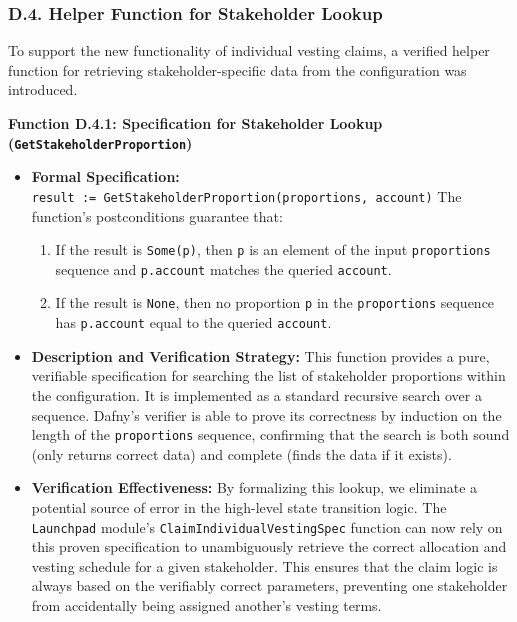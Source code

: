 \documentclass[
  english,
  onecolumn]{article}
\providecommand{\tightlist}{%
  \setlength{\itemsep}{0pt}\setlength{\parskip}{0pt}}
\begin{document}
\subsubsection{D.4. Helper Function for Stakeholder
Lookup}\label{d.4.-helper-function-for-stakeholder-lookup}

To support the new functionality of individual vesting claims, a
verified helper function for retrieving stakeholder-specific data from
the configuration was introduced.

\textbf{Function D.4.1: Specification for Stakeholder Lookup
(\texttt{GetStakeholderProportion})}

\begin{itemize}
\tightlist
\item
  \textbf{Formal Specification:}
  \texttt{result\ :=\ GetStakeholderProportion(proportions,\ account)}
  The function's postconditions guarantee that:

  \begin{enumerate}
  \def\labelenumi{\arabic{enumi}.}
  \tightlist
  \item
    If the result is \texttt{Some(p)}, then \texttt{p} is an element of
    the input \texttt{proportions} sequence and \texttt{p.account}
    matches the queried \texttt{account}.
  \item
    If the result is \texttt{None}, then no proportion \texttt{p} in the
    \texttt{proportions} sequence has \texttt{p.account} equal to the
    queried \texttt{account}.
  \end{enumerate}
\item
  \textbf{Description and Verification Strategy:} This function provides
  a pure, verifiable specification for searching the list of stakeholder
  proportions within the configuration. It is implemented as a standard
  recursive search over a sequence. Dafny's verifier is able to prove
  its correctness by induction on the length of the \texttt{proportions}
  sequence, confirming that the search is both sound (only returns
  correct data) and complete (finds the data if it exists).
\item
  \textbf{Verification Effectiveness:} By formalizing this lookup, we
  eliminate a potential source of error in the high-level state
  transition logic. The \texttt{Launchpad} module's
  \texttt{ClaimIndividualVestingSpec} function can now rely on this
  proven specification to unambiguously retrieve the correct allocation
  and vesting schedule for a given stakeholder. This ensures that the
  claim logic is always based on the verifiably correct parameters,
  preventing one stakeholder from accidentally being assigned another's
  vesting terms.
\end{itemize}
\end{document}
